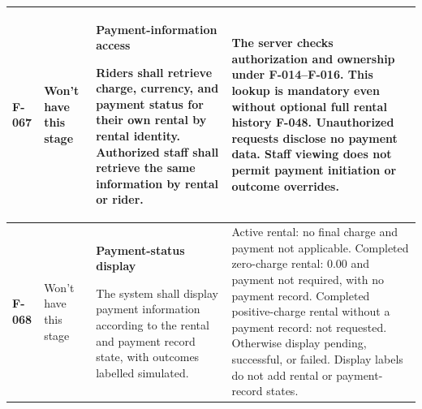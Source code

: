 \documentclass[10pt,a4paper,landscape]{article}
\newcommand{\reqtitle}[1]{{\fontsize{11}{13}\selectfont\bfseries #1}\par\nobreak\vspace{2pt}\noindent}
\begin{document}
\begin{longtable}{|C{27mm}|C{25mm}|L{79mm}|L{111mm}|}
\textbf{F-067} & Won't have this stage & \reqtitle{Payment-information access}Riders shall retrieve charge, currency, and payment status for their own rental by rental identity. Authorized staff shall retrieve the same information by rental or rider. & The server checks authorization and ownership under F-014–F-016. This lookup is mandatory even without optional full rental history F-048. Unauthorized requests disclose no payment data. Staff viewing does not permit payment initiation or outcome overrides. \\\hline

\textbf{F-068} & Won't have this stage & \reqtitle{Payment-status display}The system shall display payment information according to the rental and payment record state, with outcomes labelled simulated. & Active rental: no final charge and payment not applicable. Completed zero-charge rental: 0.00 and payment not required, with no payment record. Completed positive-charge rental without a payment record: not requested. Otherwise display pending, successful, or failed. Display labels do not add rental or payment-record states. \\\hline
\end{longtable}
\endgroup

\end{document}
